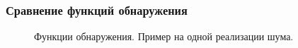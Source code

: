 \documentclass[pdf, 9pt,intlimits, unicode]{beamer}
\begin{document}
	\begin{frame}
		\frametitle{Сравнение функций обнаружения}
		\begin{figure}[!hhh]
			\caption{Функции обнаружения. Пример на одной реализации шума.}
			\label{pic:heter_funcs}
		\end{figure}
	\end{frame}
	
\end{document}

